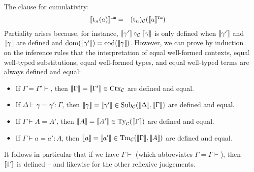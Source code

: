 \documentclass{lmcs}
\def\t{\mathrm{t}}
\newcommand{\intTmU}[1]{\llbracket #1 \rrbracket^\RawTm}
\begin{document}
The clause for cumulativity:
\begin{eqnarray*}
\intTmU{\t_n(a)} &=& (\t_n)_\C(\intTmU{a})\\
\end{eqnarray*}
Partiality arises because, for instance, $\llbracket \gamma' \rrbracket \circ_{\mathcal C} {\llbracket \gamma \rrbracket}$ is only defined when $\llbracket \gamma' \rrbracket$ and $\llbracket \gamma \rrbracket$ are defined and $\operatorname{dom}(\llbracket \gamma' \rrbracket) = \operatorname{cod}(\llbracket \gamma \rrbracket)$.
However, we can prove by induction on the inference rules that the interpretation of equal well-formed contexts, equal well-typed substitutions, equal well-formed types, and equal well-typed terms are always defined and equal:
\begin{lem}\hfill
\label{lemma:interp_defined}
  \begin{itemize}
  \item If $\Gamma = \Gamma' \vdash$, then
    $\llbracket \Gamma \rrbracket = \llbracket \Gamma' \rrbracket \in \mathrm{Ctx}_{\mathcal C}$ are defined and equal.
  \item If $\Delta \vdash \gamma = \gamma' : \Gamma$, then
    $\llbracket \gamma \rrbracket = \llbracket \gamma' \rrbracket \in \mathrm{Sub}_{\mathcal C}(\llbracket \Delta \rrbracket,{\llbracket \Gamma \rrbracket})$ are defined and
equal.
  \item If $\Gamma \vdash A = A'$, then
    $\llbracket A \rrbracket = \llbracket A' \rrbracket \in \mathrm{Ty}_{\mathcal C}(\llbracket \Gamma \rrbracket)$ are defined and equal.
  \item If $\Gamma \vdash a = a' : A$, then
    $\llbracket a \rrbracket = \llbracket a' \rrbracket \in \mathrm{Tm}_{\mathcal C}(\llbracket \Gamma \rrbracket,\llbracket A \rrbracket)$ are defined and equal.
  \end{itemize}
\end{lem}

It follows in particular that if we have $\Gamma \vdash$ (which abbreviates $\Gamma = \Gamma \vdash$), then $\llbracket \Gamma \rrbracket$ is defined -- and likewise for the other
reflexive judgements.
\end{document}
